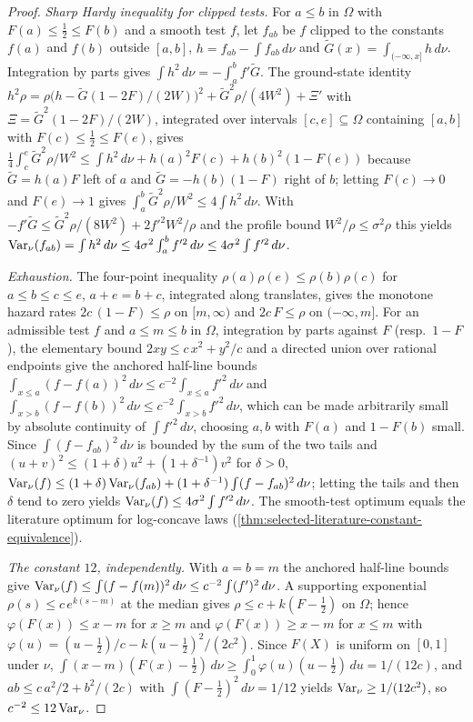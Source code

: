 \begin{proof}
  \emph{Sharp Hardy inequality for clipped tests.}  For $a\le b$ in $\Omega$ with
  $F(a)\le\tfrac12\le F(b)$ and a smooth test $f$, let $f_{ab}$ be $f$ clipped to the constants
  $f(a)$ and $f(b)$ outside $[a,b]$, $h=f_{ab}-\int f_{ab}\,d\nu$ and
  $\tilde G(x)=\int_{(-\infty,x]}h\,d\nu$.  Integration by parts gives
  $\int h^2\,d\nu=-\int_a^b f'\tilde G$.  The ground-state identity
  $h^2\rho=\rho\bigl(h-\tilde G(1-2F)/(2W)\bigr)^2+\tilde G^2\rho/(4W^2)+\Xi'$ with
  $\Xi=\tilde G^2(1-2F)/(2W)$, integrated over intervals $[c,e]\subseteq\Omega$ containing
  $[a,b]$ with $F(c)\le\tfrac12\le F(e)$, gives
  $\tfrac14\int_c^e\tilde G^2\rho/W^2\le\int h^2\,d\nu+h(a)^2F(c)+h(b)^2(1-F(e))$ because
  $\tilde G=h(a)F$ left of $a$ and $\tilde G=-h(b)(1-F)$ right of $b$; letting $F(c)\to0$ and
  $F(e)\to1$ gives $\int_a^b\tilde G^2\rho/W^2\le4\int h^2\,d\nu$.  With
  $-f'\tilde G\le\tilde G^2\rho/(8W^2)+2f'^2W^2/\rho$ and the profile bound
  $W^2/\rho\le\sigma^2\rho$ this yields
  $\operatorname{Var}_\nu(f_{ab})=\int h^2\,d\nu\le4\sigma^2\int_a^b f'^2\,d\nu\le4\sigma^2\int f'^2\,d\nu$.

  \emph{Exhaustion.}  The four-point inequality $\rho(a)\rho(e)\le\rho(b)\rho(c)$ for
  $a\le b\le c\le e$, $a+e=b+c$, integrated along translates, gives the monotone hazard rates
  $2c\,(1-F)\le\rho$ on $[m,\infty)$ and $2c\,F\le\rho$ on $(-\infty,m]$.  For an admissible test
  $f$ and $a\le m\le b$ in $\Omega$, integration by parts against $F$ (resp.\ $1-F$), the
  elementary bound $2xy\le c\,x^2+y^2/c$ and a directed union over rational endpoints give the
  anchored half-line bounds $\int_{x\le a}(f-f(a))^2\,d\nu\le c^{-2}\int_{x\le a}f'^2\,d\nu$ and
  $\int_{x>b}(f-f(b))^2\,d\nu\le c^{-2}\int_{x>b}f'^2\,d\nu$, which can be made arbitrarily
  small by absolute continuity of $\int f'^2\,d\nu$, choosing $a,b$ with $F(a)$ and $1-F(b)$
  small.  Since $\int(f-f_{ab})^2\,d\nu$ is bounded by the sum of the two tails and
  $(u+v)^2\le(1+\delta)u^2+(1+\delta^{-1})v^2$ for $\delta>0$,
  $\operatorname{Var}_\nu(f)\le(1+\delta)\operatorname{Var}_\nu(f_{ab})+(1+\delta^{-1})\int(f-f_{ab})^2\,d\nu$; letting the
  tails and then $\delta$ tend to zero yields $\operatorname{Var}_\nu(f)\le4\sigma^2\int f'^2\,d\nu$.  The
  smooth-test optimum equals the literature optimum for log-concave laws
  (\cref{thm:selected-literature-constant-equivalence}).

  \emph{The constant $12$, independently.}  With $a=b=m$ the anchored half-line bounds give
  $\operatorname{Var}_\nu(f)\le\int (f-f(m))^2\,d\nu\le c^{-2}\int (f')^2\,d\nu$.  A supporting exponential
  $\rho(s)\le c\,e^{k(s-m)}$ at the median gives $\rho\le c+k(F-\tfrac12)$ on $\Omega$; hence
  $\varphi(F(x))\le x-m$ for $x\ge m$ and $\varphi(F(x))\ge x-m$ for $x\le m$ with
  $\varphi(u)=(u-\tfrac12)/c-k(u-\tfrac12)^2/(2c^2)$.  Since $F(X)$ is uniform on $[0,1]$
  under $\nu$, $\int (x-m)(F(x)-\tfrac12)\,d\nu\ge\int_0^1\varphi(u)(u-\tfrac12)\,du
  =1/(12c)$, and $ab\le c\,a^2/2+b^2/(2c)$ with $\int (F-\tfrac12)^2\,d\nu=1/12$ yields
  $\operatorname{Var}_\nu\ge1/(12c^2)$, so $c^{-2}\le12\operatorname{Var}_\nu$.
\end{proof}

